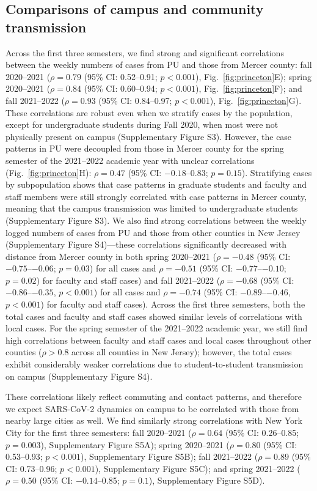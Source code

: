 \documentclass[12pt]{article}
\newcommand{\fref}[1]{Fig.~\ref{fig:#1}}
\begin{document}
\subsection*{Comparisons of campus and community transmission}

Across the first three semesters, we find strong and significant correlations between the weekly numbers of cases from PU and those from Mercer county:
fall 2020--2021 ($\rho = 0.79$ (95\% CI: 0.52--0.91; $p < 0.001$), \fref{princeton}E); spring 2020--2021 ($\rho = 0.84$ (95\% CI: 0.60--0.94; $p < 0.001$), \fref{princeton}F); and fall 2021--2022 ($\rho = 0.93$ (95\% CI: 0.84--0.97; $p < 0.001$), \fref{princeton}G). 
These correlations are robust even when we stratify cases by the population, except for undergraduate students during Fall 2020, when most were not physically present on campus (Supplementary Figure S3).
However, the case patterns in PU were decoupled from those in Mercer county for the spring semester of the 2021--2022 academic year with unclear correlations (\fref{princeton}H): $\rho = 0.47$ (95\% CI: $-0.18$--0.83; $p = 0.15$).
Stratifying cases by subpopulation shows that case patterns in graduate students and faculty and staff members were still strongly correlated with case patterns in Mercer county, meaning that the campus transmission was limited to undergraduate students (Supplementary Figure S3). 
We also find strong correlations between the weekly logged numbers of cases from PU and those from other counties in New Jersey (Supplementary Figure S4)---these correlations significantly decreased with distance from Mercer county in both spring 2020--2021 ($\rho=-0.48$ (95\% CI: $-0.75$--$-0.06$; $p = 0.03$) for all cases and $\rho=-0.51$ (95\% CI: $-0.77$--$-0.10$; $p = 0.02$) for faculty and staff cases) and fall 2021--2022 ($\rho=-0.68$ (95\% CI: $-0.86$--$-0.35$, $p < 0.001$) for all cases and $\rho=-0.74$ (95\% CI: $-0.89$--$-0.46$, $p < 0.001$) for faculty and staff cases).
Across the first three semesters, both the total cases and faculty and staff cases showed similar levels of correlations with local cases.
For the spring semester of the 2021--2022 academic year, we still find high correlations between faculty and staff cases and local cases throughout other counties ($\rho > 0.8$ across all counties in New Jersey); however, the total cases exhibit considerably weaker correlations due to student-to-student transmission on campus (Supplementary Figure S4).    

These correlations likely reflect commuting and contact patterns, and therefore we expect SARS-CoV-2 dynamics on campus to be correlated with those from nearby large cities as well. 
We find similarly strong correlations with New York City for the first three semesters: fall 2020--2021 ($\rho = 0.64$ (95\% CI: 0.26--0.85; $p = 0.003$), Supplementary Figure S5A); spring 2020--2021 ($\rho = 0.80$ (95\% CI: 0.53--0.93; $p < 0.001$), Supplementary Figure S5B); fall 2021--2022 ($\rho = 0.89$ (95\% CI: 0.73--0.96; $p < 0.001$), Supplementary Figure S5C); and spring 2021--2022 ($\rho = 0.50$ (95\% CI: $-0.14$--0.85; $p=0.1$), Supplementary Figure S5D).
\end{document}
